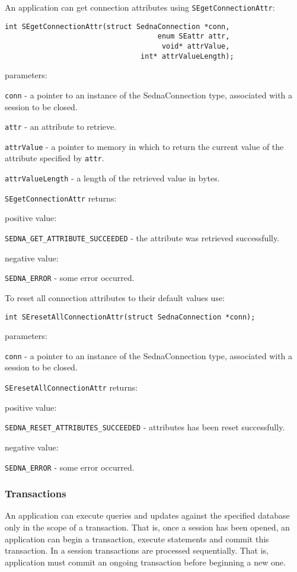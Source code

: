 \documentclass[a4paper,12pt]{article}
\begin{document}
An application can get connection attributes using \verb!SEgetConnectionAttr!:

\begin{verbatim}
int SEgetConnectionAttr(struct SednaConnection *conn,
                                    enum SEattr attr,
                                     void* attrValue,
                                int* attrValueLength);
\end{verbatim}

parameters:

\verb!conn! - a pointer to an instance of the SednaConnection type, associated with a session to be closed.

\verb!attr! - an attribute to retrieve.

\verb!attrValue! - a pointer to memory in which to return the current value of the attribute specified by \verb!attr!.

\verb!attrValueLength! - a length of the retrieved value in bytes.

\verb!SEgetConnectionAttr! returns:

positive value:

\verb!SEDNA_GET_ATTRIBUTE_SUCCEEDED! - the attribute was retrieved successfully.

negative value:

\verb!SEDNA_ERROR! - some error occurred.

To reset all connection attributes to their default values use:

\begin{verbatim}
int SEresetAllConnectionAttr(struct SednaConnection *conn);
\end{verbatim}

parameters:

\verb!conn! - a pointer to an instance of the SednaConnection type, associated with a session to be closed.

\verb!SEresetAllConnectionAttr! returns:

positive value:

\verb!SEDNA_RESET_ATTRIBUTES_SUCCEEDED! - attributes has been reset successfully.

negative value:

\verb!SEDNA_ERROR! - some error occurred.





\subsubsection{Transactions}
An application can execute queries and updates against the specified database only in the scope of a transaction. That is, once a session has been opened, an application can begin a transaction, execute statements and commit this transaction. In a session transactions are processed sequentially. That is, application must commit an ongoing transaction before beginning a new one.
\end{document}

